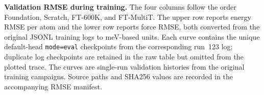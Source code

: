 \caption{\textbf{Validation RMSE during training.} The four columns follow the order Foundation, Scratch, FT-600K, and FT-MultiT. The upper row reports energy RMSE per atom and the lower row reports force RMSE, both converted from the original JSONL training logs to meV-based units. Each curve contains the unique default-head \texttt{mode=eval} checkpoints from the corresponding run~123 log; duplicate log checkpoints are retained in the raw table but omitted from the plotted trace. The curves are single-run validation histories from the original training campaigns. Source paths and SHA256 values are recorded in the accompanying RMSE manifest.}
\label{fig:original_training_rmse_four_model}
